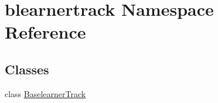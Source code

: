 \hypertarget{namespaceblearnertrack}{}\section{blearnertrack Namespace Reference}
\label{namespaceblearnertrack}
\subsection*{Classes}
\begin{DoxyCompactItemize}
\item 
class \hyperlink{classblearnertrack_1_1_baselearner_track}{Baselearner\+Track}
\end{DoxyCompactItemize}
